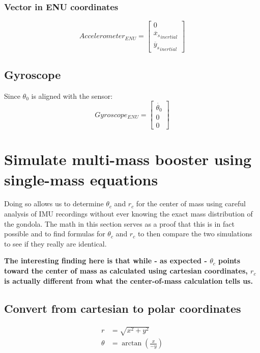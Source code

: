 \documentclass[titlepage]{article}
\numberwithin{equation}{section}
\begin{document}
\subsubsection{Vector in ENU coordinates}
\begin{equation}
Accelerometer_{ENU} = \left[ \begin{array}{c}
0 \\
\ddot{x_s}_{inertial} \\
\ddot{y_s}_{inertial}
\end{array} \right]
\end{equation}

\subsection{Gyroscope}
Since $\theta_0$ is aligned with the sensor:
\begin{equation}
Gyroscope_{ENU} = \left[ \begin{array}{c}
\dot{\theta_0} \\
0 \\
0
\end{array} \right]
\end{equation}

\section{Simulate multi-mass booster using single-mass equations}
Doing so allows us to determine $\theta_c$ and $r_c$ for the center of mass using careful analysis of IMU recordings without ever knowing the exact mass distribution of the gondola.
The math in this section serves as a proof that this is in fact possible and to find formulas for $\theta_c$ and $r_c$ to then compare the two simulations to see if they really are identical.

\bigskip
\noindent
\textbf{The interesting finding here is that while - as expected - $\theta_c$ points toward the center of mass as calculated using cartesian coordinates, $r_c$ is actually different from what the center-of-mass calculation tells us.}

\subsection{Convert from cartesian to polar coordinates}
\begin{align}
r &= \sqrt{x^2 + y^2} \\
\theta &= \arctan{\left(\frac{x}{-y}\right)}
\end{align}
\end{document}
